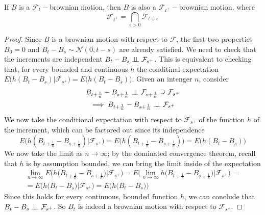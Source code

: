 \begin{proposition}
    If $B$ is a $\mathcal{F}_t-$brownian motion, then $B$ is also a $\mathcal{F}_{t^+}-$brownian motion, where
    \begin{equation*}
        \mathcal{F}_{t^+} = \bigcap_{\epsilon > 0} \mathcal{F}_{t+\epsilon}
    \end{equation*}
\end{proposition}
\begin{proof}
    Since $B$ is a brownian motion with respect to $\mathcal{F}$, the first two properties $B_0 = 0$ and $B_t-B_s \sim \mathcal{N}(0,t-s)$ are already satisfied. We need to check that the increments are independent $B_t-B_s \perp \!\!\! \perp \mathcal{F}_{s^+}$. This is equivalent to checking that, for every bounded and continuous $h$ the conditinal expectation $E\big(h(B_t-B_s) \vert \mathcal{F}_{s^+} \big) = E\big(h(B_t-B_s) \big)$. Given an intenger $n$, consider
    \begin{gather*}
        B_{t+\frac{1}{n}}-B_{s+\frac{1}{n}} \perp \!\!\! \perp \mathcal{F}_{s+\frac{1}{n}} \supseteq \mathcal{F}_{s^+} \\
        \implies B_{t+\frac{1}{n}}-B_{s+\frac{1}{n}} \perp \!\!\! \perp \mathcal{F}_{s^+}
    \end{gather*}
    We now take the conditional expectation with respect to $\mathcal{F}_{s^+}$ of the function $h$ of the increment, which can be factored out since its independence
    \begin{equation*}
        E\big( h(B_{t+\frac{1}{n}}-B_{s+\frac{1}{n}}) \big\vert \mathcal{F}_{s^+} \big) = E\big( h(B_{t+\frac{1}{n}}-B_{s+\frac{1}{n}}) \big) = E\big(h(B_t-B_s)\big)
    \end{equation*}
    We now take the limit as $n \to \infty$; by the dominated convergence theorem, recall that $h$ is by assumption bounded, we can bring the limit inside of the expectation
    \begin{gather*}
        \lim_{n \to \infty} E\Big( h\big(B_{t+\frac{1}{n}}-B_{s+\frac{1}{n}}  \big) \Big\vert \mathcal{F}_{s^+} \Big) = E\Big( \lim_{n\to\infty} h\big( B_{t+\frac{1}{n}} - B_{s+\frac{1}{n}} \big) \Big\vert \mathcal{F}_{s^+} \Big) = \\
        = E\Big( h\big( B_t - B_s \big) \Big\vert \mathcal{F}_{s^+} \Big) = E\Big( h\big( B_t - B_s \big) \Big)
    \end{gather*}
    Since this holds for every continuous, bounded function $h$, we can conclude that $B_t - B_s \perp \!\!\! \perp \mathcal{F}_{s^+}$. So $B_t$ is indeed a brownian motion with respect to $\mathcal{F}_{s^+}$. 
\end{proof}

